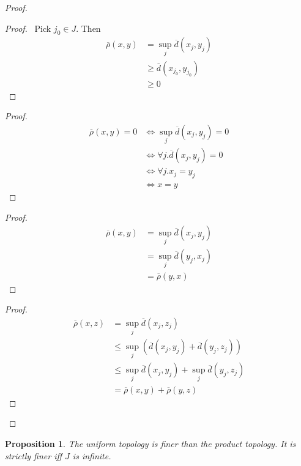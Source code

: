 \documentclass{book}
\let\qed\relax
\newtheorem{prop}[ax]{Proposition}
\theoremstyle{definition}
\begin{document}
\begin{proof}
\pf
{}
\begin{proof}
	\pf\ Pick $j_0 \in J$. Then
	\begin{align*}
		\overline{\rho}(x,y) & = \sup_j \overline{d}(x_j,y_j) \\
		& \geq \overline{d}(x_{j_0},y_{j_0}) \\
		& \geq 0
	\end{align*}
\end{proof}
\begin{proof}
	\pf
	\begin{align*}
		\overline{\rho}(x,y) = 0 & \Leftrightarrow \sup_j \overline{d}(x_j,y_j) = 0 \\
		& \Leftrightarrow \forall j. \overline{d}(x_j,y_j) = 0 \\
		& \Leftrightarrow \forall j. x_j = y_j \\
		& \Leftrightarrow x = y
	\end{align*}
\end{proof}
\begin{proof}
	\pf
	\begin{align*}
		\overline{\rho}(x,y) & = \sup_j \overline{d}(x_j,y_j) \\
		& = \sup_j \overline{d}(y_j,x_j) \\
		& = \overline{\rho}(y,x)
	\end{align*}
\end{proof}
\begin{proof}
	\pf
	\begin{align*}
		\overline{\rho}(x,z) & = \sup_j \overline{d}(x_j,z_j) \\
		& \leq \sup_j (\overline{d}(x_j,y_j) + \overline{d}(y_j,z_j)) \\
		& \leq \sup_j \overline{d}(x_j,y_j) + \sup_j \overline{d}(y_j,z_j) \\
		& = \overline{\rho}(x,y) + \overline{\rho}(y,z)
	\end{align*}
\end{proof}
\qed
\end{proof}

\begin{prop}
The uniform topology is finer than the product topology. It is strictly finer iff $J$ is infinite.
\end{prop}
\end{document}
